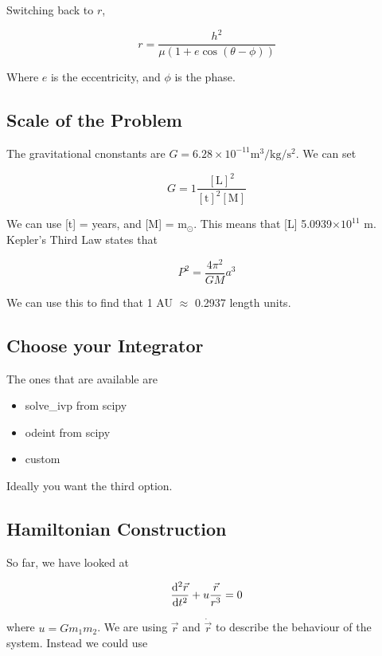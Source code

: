 \documentclass[]{article}
\begin{document}
Switching back to $r$,

\[r = \frac{h^2}{\mu(1+e\cos(\theta - \phi))}\]

Where $e$ is the eccentricity, and $\phi$ is the phase.


\subsection{Scale of the Problem}\bigbreak

The gravitational cnonstants are $G = 6.28 \times 10^{-11} \text{m}^3/\text{kg}/\text{s}^2$. We can set 

\[G = 1 \frac{[\text{L}]^2}{[\text{t}]^2 [\text{M}]}\] 

We can use [t] = years, and [M] = m$_\odot$. This means that [L]  5.0939$\times 10^11$ m.\\

Kepler's Third Law states that

\[P^2 = \frac{4\pi^2}{GM}a^3\]

We can use this to find that 1 AU $\approx$ 0.2937 length units.\\


\subsection{Choose your Integrator}\bigbreak

The ones that are available are

\begin{itemize}
	\item solve\_ivp from scipy
	\item odeint from scipy
	\item custom
\end{itemize}\bigbreak

Ideally you want the third option.\\



\subsection{Hamiltonian Construction}\bigbreak

So far, we have looked at 

\[\dv[2]{\vec{r}}{t} + u \frac{\vec{r}}{r^3} = 0\]

where $u = Gm_1m_2$. We are using $\vec{r}$ and $\dot{\vec{r}}$ to describe the behaviour of the system. Instead we could use
\end{document}

